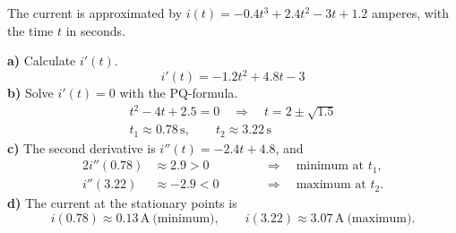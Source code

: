 \begin{exempel}
The current is approximated by $i(t) = -0.4t^3 + 2.4t^2 - 3t + 1.2$ amperes, with the time $t$ in
seconds.
\par\noindent\textbf{a)} Calculate $i'(t)$.
\[
  i'(t) = -1.2t^2 + 4.8t - 3
\]
\textbf{b)} Solve $i'(t) = 0$ with the PQ-formula.
\begin{gather*}
  t^2 - 4t + 2.5 = 0 \quad \Rightarrow \quad t = 2 \pm \sqrt{1.5} \\
  t_1 \approx 0.78\,\text{s}, \qquad t_2 \approx 3.22\,\text{s}
\end{gather*}
\textbf{c)} The second derivative is $i''(t) = -2.4t + 4.8$, and
\begin{alignat*}{2}
  i''(0.78) &\approx 2.9 > 0 &\qquad& \Rightarrow \quad \text{minimum at } t_1, \\
  i''(3.22) &\approx -2.9 < 0 && \Rightarrow \quad \text{maximum at } t_2.
\end{alignat*}
\textbf{d)} The current at the stationary points is
\[
  i(0.78) \approx 0.13\,\text{A} \ \text{(minimum)}, \qquad
  i(3.22) \approx 3.07\,\text{A} \ \text{(maximum)}.
\]
\end{exempel}
